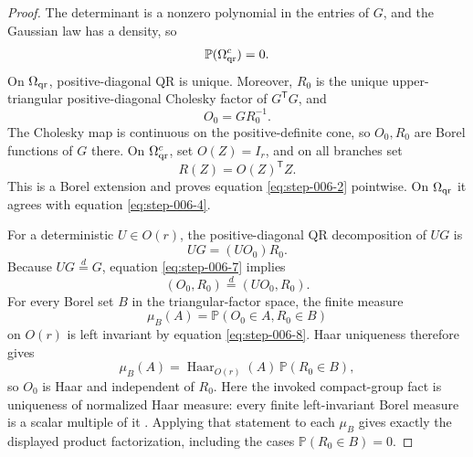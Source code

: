 \begin{proof}
The determinant is a nonzero polynomial in the
entries of \(G\), and the Gaussian law has a density, so
\begin{equation}
  \mathbb P(\Omega_{\rm qr}^c)=0.                              \label{eq:step-006-5}
\end{equation}
On \(\Omega_{\rm qr}\), positive-diagonal QR is unique. Moreover,
\(R_0\) is the unique upper-triangular positive-diagonal Cholesky factor of
\(G^{\mathsf T}G\), and
\begin{equation}
  O_0=GR_0^{-1}.                                               \label{eq:step-006-6}
\end{equation}
The Cholesky map is continuous on the positive-definite cone, so \(O_0,R_0\)
are Borel functions of \(G\) there. On \(\Omega_{\rm qr}^c\), set
\(O(Z)=I_r\), and on all branches set
\[
  R(Z)=O(Z)^{\mathsf T}Z.
\]
This is a Borel extension and proves equation \eqref{eq:step-006-2} pointwise. On
\(\Omega_{\rm qr}\) it agrees with equation \eqref{eq:step-006-4}.

For a deterministic \(U\in O(r)\), the positive-diagonal QR decomposition of
\(UG\) is
\begin{equation}
  UG=(UO_0)R_0.                                                \label{eq:step-006-7}
\end{equation}
Because \(UG\stackrel d=G\), equation \eqref{eq:step-006-7} implies
\begin{equation}
  (O_0,R_0)\stackrel d=(UO_0,R_0).                            \label{eq:step-006-8}
\end{equation}
For every Borel set \(B\) in the triangular-factor space, the finite measure
\[
  \mu_B(A)=\mathbb P(O_0\in A,R_0\in B)
\]
on \(O(r)\) is left invariant by equation \eqref{eq:step-006-8}. Haar uniqueness therefore gives
\begin{equation}
  \mu_B(A)=\operatorname{Haar}_{O(r)}(A)\,
            \mathbb P(R_0\in B),                             \label{eq:step-006-9}
\end{equation}
so \(O_0\) is Haar and independent of \(R_0\).
Here the invoked compact-group fact is uniqueness of normalized Haar measure:
every finite left-invariant Borel measure is a scalar multiple of it
\citep[Chapter~2]{folland1999}.  Applying that statement to each \(\mu_B\)
gives exactly the displayed product factorization, including the cases
\(\mathbb P(R_0\in B)=0\).


\end{proof}
